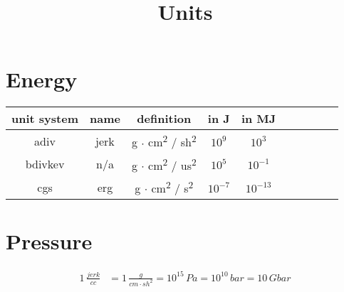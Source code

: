 \documentclass[11pt]{article}
\title{Units}
\begin{document}
\maketitle

\section{Energy}

\setlength{\cellspacetoplimit}{3pt}
\setlength{\cellspacebottomlimit}{3pt}

\begin{center}
    \begin{tabular}{|Sc|Sc|Sc|Sc|Sc|}
        \hline
        unit system & name & definition & in J & in MJ \\
        \hline
        adiv & jerk & g \( \cdot \) cm\textsuperscript{2} / sh\textsuperscript{2} & $10^9$ & $10^3$ \\
        \hline
        bdivkev & n/a & g \( \cdot \) cm\textsuperscript{2} / us\textsuperscript{2} & $10^5$ & $10^{-1}$ \\
        \hline
        cgs & erg & g \( \cdot \) cm\textsuperscript{2} / s\textsuperscript{2} & $10^{-7}$ & $10^{-13}$ \\
        \hline
    \end{tabular}
\end{center}

\section{Pressure}

\begin{align}
    1 \, \frac{jerk}{cc} & = 1 \, \frac{g}{cm \cdot sh^2} = 10^{15} \, Pa = 10^{10} \, bar = 10 \, Gbar
\end{align}
\end{document}

